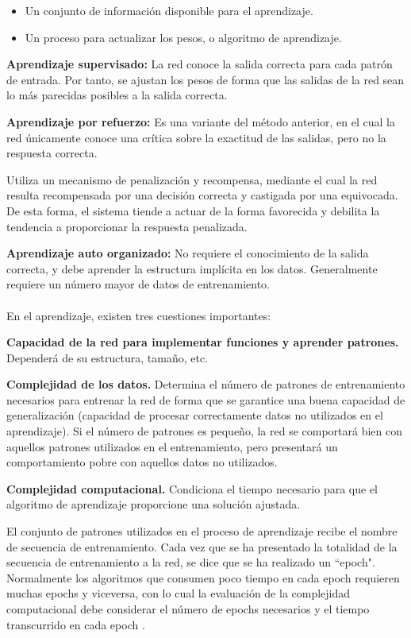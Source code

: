 		\begin{itemize}
			\item Un conjunto de información disponible para el aprendizaje.
			\item Un proceso para actualizar los pesos, o algoritmo de aprendizaje.
		\end{itemize}

		\textbf{Aprendizaje supervisado:}
		La red conoce la salida correcta para cada patrón de entrada. Por tanto, se ajustan los pesos de forma que las salidas de la red sean lo más parecidas posibles a la salida correcta.

		\textbf{Aprendizaje por refuerzo:}
		Es una variante del método anterior, en el cual la red únicamente conoce una crítica sobre la exactitud de las salidas, pero no la respuesta correcta.

		Utiliza un mecanismo de penalización y recompensa, mediante el cual la red resulta recompensada por una decisión correcta y castigada por una equivocada. De esta forma, el sistema tiende a actuar de la forma favorecida y debilita la tendencia a proporcionar la respuesta penalizada.

		\textbf{Aprendizaje auto organizado:}
		No requiere el conocimiento de la salida correcta, y debe aprender la estructura implícita en los datos. Generalmente requiere un número mayor de datos de entrenamiento.

		\paragraph{}
		En el aprendizaje, existen tres cuestiones importantes:
		
		\textbf{Capacidad de la red para implementar funciones y aprender patrones.}
		Dependerá de su estructura, tamaño, etc.

		\textbf{Complejidad de los datos.}
		Determina el número de patrones de entrenamiento necesarios para entrenar la red de forma que se garantice una buena capacidad de generalización (capacidad de procesar correctamente datos no utilizados en el aprendizaje). Si el número de patrones es pequeño, la red se comportará bien con aquellos patrones utilizados en el entrenamiento, pero presentará un comportamiento pobre con aquellos datos no utilizados.

		\textbf{Complejidad computacional.}
		Condiciona el tiempo necesario para que el algoritmo de aprendizaje proporcione una solución ajustada.

		El conjunto de patrones utilizados en el proceso de aprendizaje recibe el nombre de secuencia de entrenamiento. Cada vez que se ha presentado la totalidad de la secuencia de entrenamiento a la red, se dice que se ha realizado un ``epoch". Normalmente los algoritmos que consumen poco tiempo en cada epoch requieren muchas epochs y viceversa, con lo cual la evaluación de la complejidad computacional debe considerar el número de epochs necesarios y el tiempo transcurrido en cada epoch \cite{Faundez2001}.

